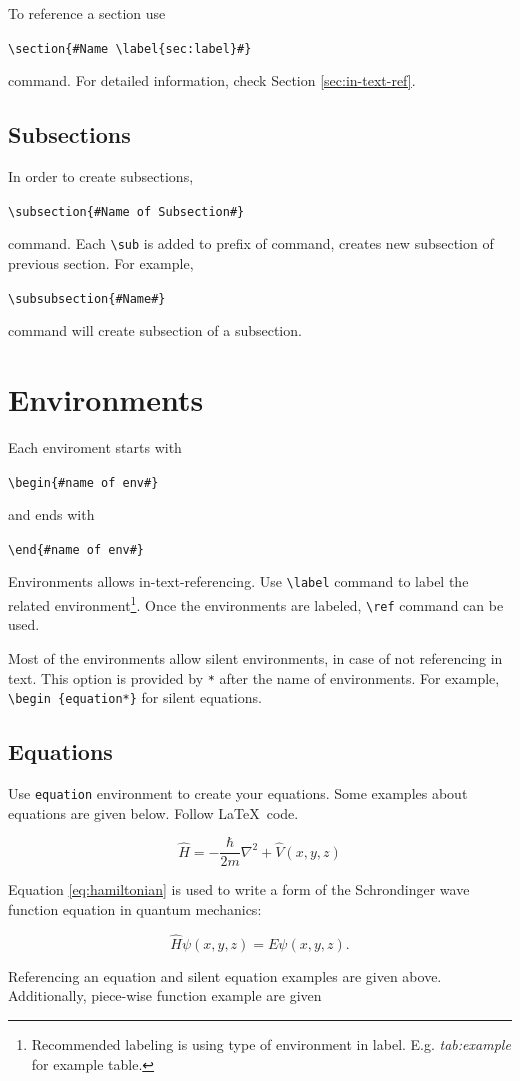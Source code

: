 \documentclass[a4paper,12pt]{article}
\newcommand{\writecommand}[2]{
    \begin{center}
        \texttt{\textbackslash #1\{\##2\#\}} \\
    \end{center}
}
\begin{document}
To reference a section use \writecommand{section}{Name \textbackslash label\{sec:label\}}
command. For detailed information, check Section \ref{sec:in-text-ref}.

\subsection{Subsections}
In order to create subsections, \writecommand{subsection}{Name of Subsection} command. Each \texttt{\textbackslash sub} is added to prefix of command, creates new subsection of previous section. For example, \writecommand{subsubsection}{Name} command will create subsection of a subsection.

\section{Environments}
Each enviroment starts with \writecommand{begin}{name of env} and ends with \writecommand{end}{name of env} Environments allows in-text-referencing. Use \texttt{\textbackslash label} command to label the related environment\footnote{Recommended labeling is using type of environment in label. E.g. \textit{tab:example} for example table.}. Once the environments are labeled, \texttt{\textbackslash ref} command can be used. 

Most of the environments allow silent environments, in case of not referencing in text. This option is provided by \texttt{*} after the name of environments. For example, \texttt{\textbackslash begin \{equation*\}} for silent equations.

\subsection{Equations}
Use \texttt{equation} environment to create your equations. Some examples about equations are given below. Follow \LaTeX~code.

\begin{equation}
    \hat{H} = - \frac{\hbar}{2m}\nabla^2 + \hat{V}(x,y,z)
    \label{eq:hamiltonian}
\end{equation}

Equation \ref{eq:hamiltonian} is used to write a form of the Schrondinger wave function equation in quantum mechanics:

\begin{equation*}
    \hat{H}\psi(x,y,z) = E\psi(x,y,z).
\end{equation*}

Referencing an equation and silent equation examples are given above. Additionally, piece-wise function example are given
\end{document}
